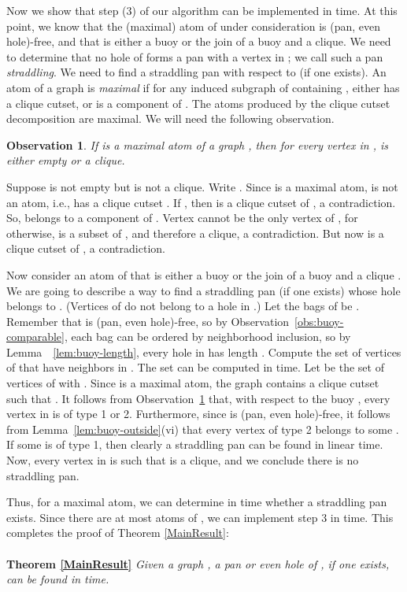 \documentclass[11pt,a4paper]{article}
\newtheorem{observation}[theorem]{Observation}
\newenvironment{proof}{\noindent {\it Proof:~}}{\hfill \smallskip\par}
\begin{document}
Now we show that step (3) of our algorithm can be implemented in
 time. At this point, we know that the (maximal) atom 
of  under consideration is (pan, even hole)-free, and that
 is either a buoy or the join of a buoy and a clique. We need
to determine that no hole of  forms a pan with a vertex in ; we call such a pan {\em straddling}. We need to find a
straddling pan with respect to  (if one exists). An atom  of
a graph  is {\it maximal} if for any induced subgraph  of
 containing , either  has a clique cutset, or  is a
component of . The atoms produced by the clique cutset
decomposition are maximal. We will need the following observation.
\begin{observation}\label{obs:maximal-atom}
If  is a maximal atom of a graph , then for every vertex 
in ,  is either empty or a clique.
\end{observation}
\begin{proof}
Suppose  is not empty but is not a clique. Write . Since  is a maximal atom,  is not an atom,
i.e.,  has a clique cutset . If , then 
is a clique cutset of , a contradiction. So,  belongs to a
component  of . Vertex  cannot be the only vertex of
, for otherwise,  is a subset of , and therefore a
clique, a contradiction. But now  is a clique cutset of , a
contradiction.
\end{proof}
Now consider
an atom  of  that is either a buoy 
or the join of a
buoy  and a clique . We are going to
describe a way to  find a straddling pan (if one exists) whose
hole belongs to . (Vertices of  do not belong to a hole in .)
Let the bags of  be .
Remember that  is (pan, even hole)-free, so by Observation~\ref{obs:buoy-comparable},
each bag can be ordered by neighborhood inclusion, so by Lemma~~\ref{lem:buoy-length},
every hole in  has length .
Compute the set  of vertices of 
that have neighbors in . The set  can be computed in 
time. Let  be the set of vertices  of  with . Since  is a maximal atom, the graph
 contains a clique cutset  such that . It follows from Observation~\ref{obs:maximal-atom} that, with
respect to the buoy , every vertex in  is of type 1 or 2.
Furthermore, since  is (pan, even hole)-free, it follows from Lemma~\ref{lem:buoy-outside}(vi) 
that every vertex of type 2 belongs to some . If
some  is of type 1, then clearly a straddling pan can be
found in linear time.
Now, every vertex  in  is such that   is a clique, and we conclude there is no straddling
pan.

Thus, for a maximal atom, we can determine in  time whether
a straddling pan exists. Since there are at most  atoms of
, we can implement step 3 in  time. This completes the proof
of Theorem \ref{MainResult}:
\\
\\
\noindent\textbf{Theorem \ref{MainResult}} \textit{Given a graph , a pan or even hole of , if one exists, can be found in  time.}
\\
\end{document}
